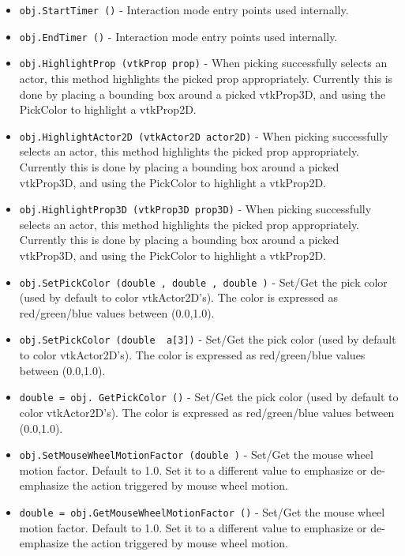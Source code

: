 \begin{itemize}
\item  \verb|obj.StartTimer ()| -  Interaction mode entry points used internally.  

\item  \verb|obj.EndTimer ()| -  Interaction mode entry points used internally.  

\item  \verb|obj.HighlightProp (vtkProp prop)| -  When picking successfully selects an actor, this method highlights the
 picked prop appropriately. Currently this is done by placing a bounding 
 box around a picked vtkProp3D, and using the PickColor to highlight a
 vtkProp2D. 

\item  \verb|obj.HighlightActor2D (vtkActor2D actor2D)| -  When picking successfully selects an actor, this method highlights the
 picked prop appropriately. Currently this is done by placing a bounding 
 box around a picked vtkProp3D, and using the PickColor to highlight a
 vtkProp2D. 

\item  \verb|obj.HighlightProp3D (vtkProp3D prop3D)| -  When picking successfully selects an actor, this method highlights the
 picked prop appropriately. Currently this is done by placing a bounding 
 box around a picked vtkProp3D, and using the PickColor to highlight a
 vtkProp2D. 

\item  \verb|obj.SetPickColor (double , double , double )| -  Set/Get the pick color (used by default to color vtkActor2D's).
 The color is expressed as red/green/blue values between (0.0,1.0).

\item  \verb|obj.SetPickColor (double  a[3])| -  Set/Get the pick color (used by default to color vtkActor2D's).
 The color is expressed as red/green/blue values between (0.0,1.0).

\item  \verb|double = obj. GetPickColor ()| -  Set/Get the pick color (used by default to color vtkActor2D's).
 The color is expressed as red/green/blue values between (0.0,1.0).

\item  \verb|obj.SetMouseWheelMotionFactor (double )| -  Set/Get the mouse wheel motion factor. Default to 1.0. Set it to a 
 different value to emphasize or de-emphasize the action triggered by
 mouse wheel motion.

\item  \verb|double = obj.GetMouseWheelMotionFactor ()| -  Set/Get the mouse wheel motion factor. Default to 1.0. Set it to a 
 different value to emphasize or de-emphasize the action triggered by
 mouse wheel motion.


\end{itemize}
